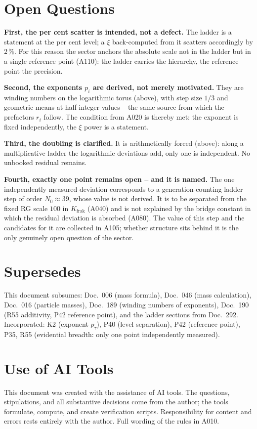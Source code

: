 \section{Open Questions}

\textbf{First, the per cent scatter is intended, not a defect.} The ladder is a
statement at the per cent level; a $\xi$ back-computed from it scatters accordingly
by $2\,\%$. For this reason the sector anchors the absolute scale not in the
ladder but in a single reference point (A110): the ladder carries the hierarchy,
the reference point the precision.

\textbf{Second, the exponents $p_i$ are derived, not merely motivated.} They are
winding numbers on the logarithmic torus (above), with step size $1/3$ and
geometric means at half-integer values -- the same source from which the prefactors
$r_i$ follow. The condition from A020 is thereby met: the exponent is fixed
independently, the $\xi$ power is a statement.

\textbf{Third, the doubling is clarified.} It is arithmetically forced (above):
along a multiplicative ladder the logarithmic deviations add, only one is
independent. No unbooked residual remains.

\textbf{Fourth, exactly one point remains open -- and it is named.} The one
independently measured deviation corresponds to a generation-counting ladder step
of order $N_0 \approx 39$, whose value is not derived. It is to be separated
from the fixed RG scale $100$ in $K_\text{frak}$ (A040) and is not explained by
the bridge constant in which the residual deviation is absorbed (A080). The value
of this step and the candidates for it are collected in A105; whether structure
sits behind it is the only genuinely open question of the sector.

\section{Supersedes}

This document subsumes: Doc.~006 (mass formula), Doc.~046 (mass calculation),
Doc.~016 (particle masses), Doc.~189 (winding numbers of exponents), Doc.~190
(R55 additivity, P42 reference point), and the ladder sections from Doc.~292.
Incorporated: K2 (exponent $p_\tau$), P40 (level separation), P42 (reference
point), P35, R55 (evidential breadth: only one point independently measured).

\section{Use of AI Tools}

This document was created with the assistance of AI tools. The questions,
stipulations, and all substantive decisions come from the author; the tools
formulate, compute, and create verification scripts.
Responsibility for content and errors rests entirely with the author.
Full wording of the rules in A010.
